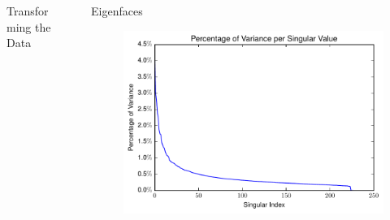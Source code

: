 \documentclass[final]{beamer}
\newlength{\sepwid}
\newlength{\onecolwid}
\begin{document}
\begin{frame}[t]
\begin{columns}[t]
\begin{column}{\onecolwid}
\begin{block}{Transforming the Data}
\end{block}


\end{column} %

\begin{column}{\sepwid}\end{column} %

\begin{column}{\onecolwid} %


\begin{block}{Eigenfaces}


\begin{figure}
\centering
  \centering
  \includegraphics[width=.75\linewidth]{../data/Singularvalue_Variance.pdf}
  \label{fig:sing_var}
\end{figure}


\end{block}
\end{column}
\end{columns}
\end{frame}
\end{document}
